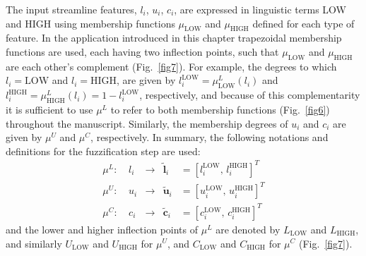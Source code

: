 The input streamline features, $l_{i}$, $u_{i}$, $c_{i}$, are expressed in linguistic terms LOW and HIGH using membership functions $\mu_{\textrm{LOW}}$ and $\mu_{\textrm{HIGH}}$ defined for each type of feature. In the application introduced in this chapter trapezoidal membership functions are used, each having two inflection points, such that $\mu_{\textrm{LOW}}$ and $\mu_{\textrm{HIGH}}$ are each other's complement (Fig.~\ref{fig7}). For example, the degrees to which $l_{i}=\textrm{LOW}$ and $l_{i}=\textrm{HIGH}$, are given by $l_{i}^{\textrm{LOW}}=\mu^{L}_{\textrm{LOW}}(l_{i})$ and $l_{i}^{\textrm{HIGH}}=\mu^{L}_{\textrm{HIGH}}(l_{i})=1-l_{i}^{\textrm{LOW}}$, respectively, and because of this complementarity it is sufficient to use $\mu^{L}$  to refer to both membership functions (Fig.~\ref{fig6}) throughout the manuscript. Similarly, the membership degrees of $u_{i}$ and $c_{i}$ are given by $\mu^{U}$ and $\mu^{C}$, respectively. In summary, the following notations and definitions for the fuzzification step are used:
\begin{equation}
\begin{array}{lcccl}
\mu^{L}\!:\ & l_{i} & \rightarrow & \tilde{\mathbf{l}}_{i} & = \left[l_{i}^{\textrm{LOW}}\!,\, l_{i}^{\textrm{HIGH}}\right]^T \\[1ex]
\mu^{U}\!:\ & u_{i} & \rightarrow & \tilde{\mathbf{u}}_{i} & = \left[u_{i}^{\textrm{LOW}}\!,\, u_{i}^{\textrm{HIGH}}\right]^T \\[1ex]
\mu^{C}\!:\ & c_{i} & \rightarrow & \tilde{\mathbf{c}}_{i} & = \left[c_{i}^{\textrm{LOW}}\!,\, c_{i}^{\textrm{HIGH}}\right]^T
\end{array}
\end{equation}
and the lower and higher inflection points of $\mu^{L}$ are denoted by $L_{\textrm{LOW}}$ and $L_{\textrm{HIGH}}$, and similarly $U_{\textrm{LOW}}$ and $U_{\textrm{HIGH}}$ for $\mu^{U}$, and $C_{\textrm{LOW}}$ and $C_{\textrm{HIGH}}$ for $\mu^{C}$ (Fig.~\ref{fig7}).

